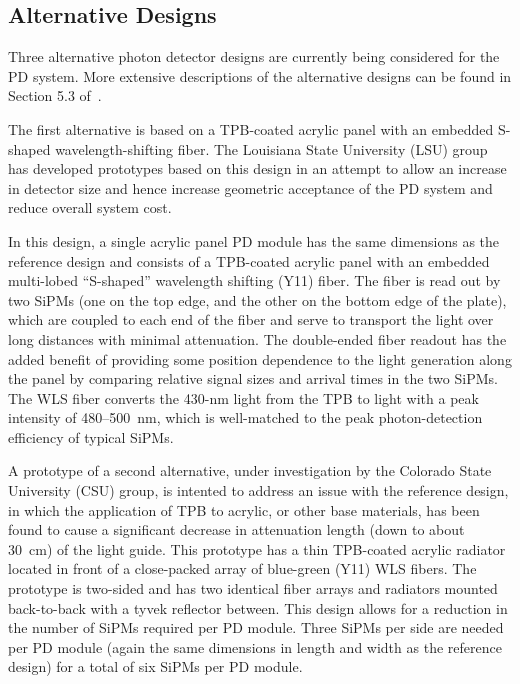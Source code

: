 \subsection{Alternative Designs} 

Three alternative photon detector designs are currently being considered for the PD
system. More extensive descriptions of the alternative designs can be found in 
Section 5.3 of~\cite{cdr-annex-lbne-design}.

The first alternative is based on a TPB-coated acrylic panel with an
embedded S-shaped wavelength-shifting fiber. The Louisiana State
University (LSU) group has developed prototypes based on this design
in an attempt to allow an increase in detector size and hence increase
geometric acceptance of the PD system and reduce overall system
cost.

In this design, a single acrylic panel PD module has the same
dimensions as the reference design and consists of a TPB-coated
acrylic panel with an embedded multi-lobed ``S-shaped'' wavelength
shifting (Y11) fiber. The fiber is read out by two SiPMs (one on the
top edge, and the other on the bottom edge of the plate), which are
coupled to each end of the fiber and serve to transport the light over
long distances with minimal attenuation. The double-ended fiber
readout has the added benefit of providing some position dependence to
the light generation along the panel by comparing relative signal
sizes and arrival times in the two SiPMs. The WLS fiber converts the
430-nm light from the TPB to light with a peak intensity of
480--500~nm, which is well-matched to the peak photon-detection
efficiency of typical SiPMs.

A prototype of a second alternative, under investigation by the Colorado
State University (CSU) group, is intented to address an issue with the reference
design, in which the application of TPB to acrylic, or other base
materials, has been found to cause a significant decrease in
attenuation length (down to about 30~cm) of the light guide.
%
This prototype has a thin TPB-coated acrylic radiator located in front
of a close-packed array of blue-green (Y11) WLS fibers.  The prototype
is two-sided and has two identical fiber arrays and radiators mounted
back-to-back with a tyvek reflector between. This design allows for a
reduction in the number of SiPMs required per PD module. Three SiPMs
per side are needed per PD module (again the same dimensions in length
and width as the reference design) for a total of six SiPMs per PD
module.

